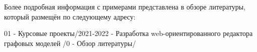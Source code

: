 Более подробная информация с примерами представлена в обзоре литературы, который размещён по следующему адресу:

\textsf{01 - Курсовые проекты/2021-2022 - Разработка web-ориентированного редактора графовых моделей /0 - Обзор литературы/	}

\noteattributes{}
